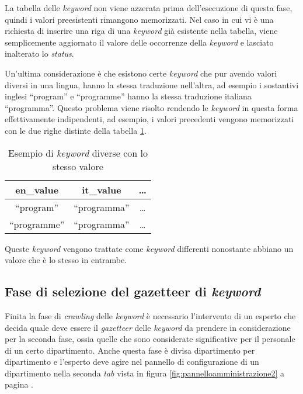 \documentclass[tesi.tex]{subfiles}
\begin{document}
    La tabella delle \emph{keyword} non viene
    azzerata prima dell'esecuzione di questa fase, quindi i valori
    preesistenti rimangono memorizzati. Nel caso in cui vi \`e una
    richiesta di inserire una riga di una \emph{keyword} gi\`a
    esistente nella tabella, viene semplicemente aggiornato il valore
    delle occorrenze della \emph{keyword} e lasciato inalterato lo
    \emph{status}.

    Un'ultima considerazione \`e che esistono certe \emph{keyword} che
    pur avendo valori diversi in una lingua, hanno la stessa
    traduzione nell'altra, ad esempio i sostantivi inglesi ``program''
    e ``programme'' hanno la stessa traduzione italiana
    ``programma''. Questo problema viene risolto rendendo le
    \emph{keyword} in questa forma effettivamente indipendenti, ad
    esempio, i valori precedenti vengono memorizzati con le due righe
    distinte della tabella \ref{table:esempiokeywordsuguali}.
    \begin{table}
      \begin{center}
        \begin{tabular}{|c|c|c|}
          \hline
              {\bfseries en\_value} & {\bfseries it\_value} & {\bfseries \ldots} \\
              \hline
              ``program'' & ``programma'' & \ldots\\
              ``programme'' & ``programma'' & \ldots\\
              \hline
        \end{tabular}
      \end{center}
      \caption{Esempio di \emph{keyword} diverse con lo stesso valore}
      \label{table:esempiokeywordsuguali}
    \end{table}
    Queste \emph{keyword} vengono trattate come \emph{keyword} differenti
    nonostante abbiano un valore che \`e lo stesso in entrambe.

\subsection{Fase di selezione del gazetteer di \emph{keyword}}\label{sec:gazkeywords}
Finita la fase di \emph{crawling} delle \emph{keyword} \`e necessario
l'intervento di un esperto che decida quale deve essere il
\emph{gazetteer} delle \emph{keyword} da prendere in considerazione
per la seconda fase, ossia quelle che sono considerate significative
per il personale di un certo dipartimento. Anche
questa fase \`e divisa dipartimento per dipartimento e l'esperto
deve agire nel pannello di configurazione di un dipartimento nella
seconda \emph{tab} vista in figura \ref{fig:pannelloamministrazione2}
a pagina \pageref{fig:pannelloamministrazione2}.
\end{document}

